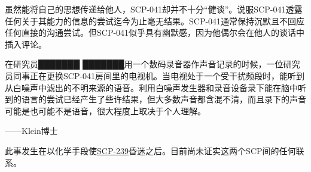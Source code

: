 虽然能将自己的思想传递给他人，SCP-041却并不十分“健谈”。说服SCP-041透露任何关于其能力的信息的尝试迄今为止毫无结果。SCP-041通常保持沉默且不回应任何直接的沟通尝试。但SCP-041似乎具有幽默感，因为他偶尔会在他人的谈话中插入评论。

在研究员███████ ███████用一个数码录音器作声音记录的时候，一位研究员同事正在更换SCP-041房间里的电视机。当电视处于一个受干扰频段时，能听到从白噪声中滤出的不明来源的语音。利用白噪声发生器和录音设备录下能在脑中听到的语言的尝试已经产生了些许结果，但大多数声音都含混不清，而且录下的声音可能是也可能不是语音，很大程度上取决于个人理解。

——Klein博士


此事发生在以化学手段使\hyperref[chap:SCP-239]{SCP-239}昏迷之后。目前尚未证实这两个SCP间的任何联系。
